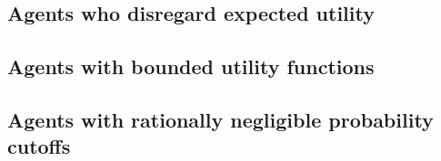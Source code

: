\documentclass{article}
\begin{document}
\subsection{Agents who disregard expected utility}
\subsection{Agents with bounded utility functions}
\subsection{Agents with rationally negligible probability cutoffs}



\end{document}
